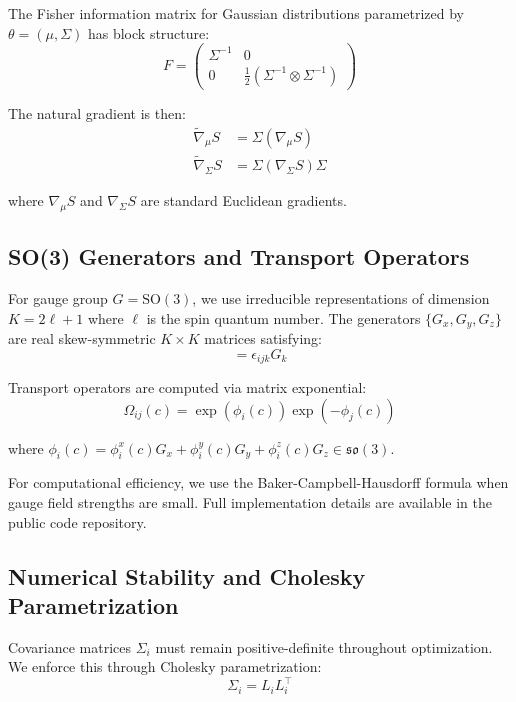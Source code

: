 \documentclass[11pt]{article}
\begin{document}
The Fisher information matrix for Gaussian distributions parametrized by $\theta = (\mu, \Sigma)$ has block structure:
\begin{equation}
F = \begin{pmatrix}
\Sigma^{-1} & 0 \\
0 & \frac{1}{2}(\Sigma^{-1} \otimes \Sigma^{-1})
\end{pmatrix}
\end{equation}

The natural gradient is then:
\begin{align}
\tilde{\nabla}_\mu S &= \Sigma (\nabla_\mu S) \\
\tilde{\nabla}_\Sigma S &= \Sigma (\nabla_\Sigma S) \Sigma
\end{align}

where $\nabla_\mu S$ and $\nabla_\Sigma S$ are standard Euclidean gradients.

\subsection{SO(3) Generators and Transport Operators}

For gauge group $G = \mathrm{SO}(3)$, we use irreducible representations of dimension $K = 2\ell + 1$ where $\ell$ is the spin quantum number. The generators $\{G_x, G_y, G_z\}$ are real skew-symmetric $K \times K$ matrices satisfying:
\begin{equation}
[G_i, G_j] = \epsilon_{ijk} G_k
\end{equation}

Transport operators are computed via matrix exponential:
\begin{equation}
\Omega_{ij}(c) = \exp(\phi_i(c)) \exp(-\phi_j(c))
\end{equation}

where $\phi_i(c) = \phi_i^x(c) G_x + \phi_i^y(c) G_y + \phi_i^z(c) G_z \in \mathfrak{so}(3)$.

For computational efficiency, we use the Baker-Campbell-Hausdorff formula when gauge field strengths are small. Full implementation details are available in the public code repository.

\subsection{Numerical Stability and Cholesky Parametrization}

Covariance matrices $\Sigma_i$ must remain positive-definite throughout optimization. We enforce this through Cholesky parametrization:
\begin{equation}
\Sigma_i = L_i L_i^\top
\end{equation}
\end{document}
